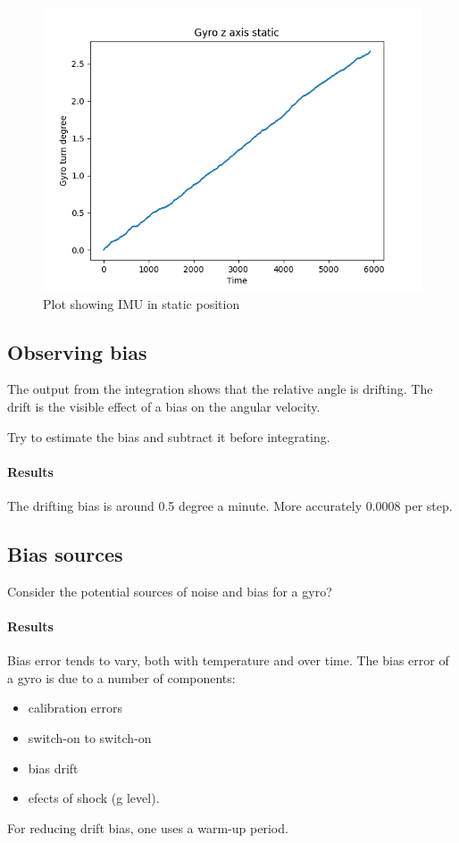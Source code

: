 \documentclass[paper=letter, fontsize=10pt]{article}
\begin{document}
\begin{figure}
	\centering
	\includegraphics[scale=0.65]{Figures/ex2_gyro_static}
	\caption{Plot showing IMU in static position}
	\label{fig:ex2_gyro_static}
\end{figure}


\subsection{Observing bias}
The output from the integration shows that the relative angle is drifting. The drift is the visible effect of a bias on the angular velocity.

Try to estimate the bias and subtract it before integrating.  

\paragraph{Results}
The drifting bias is around 0.5 degree a minute. More accurately 0.0008 per step.

\subsection{Bias sources}
Consider the potential sources of noise and bias for a gyro?

\paragraph{Results} Bias error tends to vary, both with temperature and over time. The bias error of a gyro is due to a number of components:
\begin{itemize}
\item calibration errors
\item switch-on to switch-on
\item bias drift
\item efects of shock (g level)\cite{sensorwiki}.
\end{itemize}
For reducing drift bias, one uses a  warm-up period.
\end{document}
